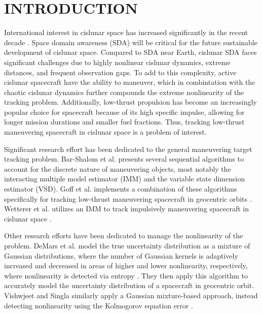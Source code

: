 
\chapter{INTRODUCTION}

International interest in cislunar space has increased significantly in the recent decade \cite{nelson2024moon}. Space domain awareness (SDA) will be critical for the future sustainable development of cislunar space. Compared to SDA near Earth, cislunar SDA faces significant challenges due to highly nonlinear cislunar dynamics, extreme distances, and frequent observation gaps. To add to this complexity, active cislunar spacecraft have the ability to maneuver, which in combintation with the chaotic cislunar dynamics further compounds the extreme nonlinearity of the tracking problem. Additionally, low-thrust propulsion has become an increasingly popular choice for spacecraft because of its high specific impulse, allowing for longer mission durations and smaller fuel fractions. Thus, tracking low-thrust maneuvering spacecraft in cislunar space is a problem of interest. 

Significant research effort has been dedicated to the general maneuvering target tracking problem. Bar-Shalom et al. presents several sequential algorithms to account for the discrete nature of maneuvering objects, most notably the interacting multiple model estimator \cite{bar1989tracking} (IMM) and the variable state dimension estimator \cite{bar2007variable} (VSD). Goff et al. implements a combination of these algorithms specifically for tracking low-thrust maneuvering spacecraft in geocentric orbits \cite{goff2015orbit}. Wetterer et al. utilizes an IMM to track impulsively maneuvering spacecraft in cislunar space \cite{wetterer2022cislunar}.

Other research efforts have been dedicated to manage the nonlinearity of the problem. DeMars et al. model the true uncertainty distribution as a mixture of Gaussian distributions, where the number of Gaussian kernels is adaptively increased and decreased in areas of higher and lower nonlinearity, respectively, where nonlinearity is detected via entropy \cite{demars2013entropy}. They then apply this algorithm to accurately model the uncertainty distribution of a spacecraft in geocentric orbit. Vishwjeet and Singla similarly apply a Gaussian mixture-based approach, instead detecting nonlinearity using the Kolmogorov equation error \cite{vishwajet2018adaptive}. 

